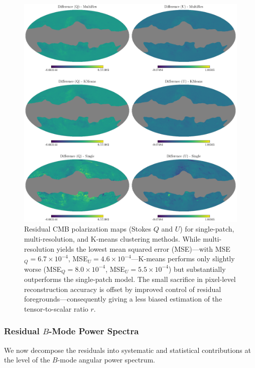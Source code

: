 \documentclass[%
 reprint,
bibnotes,
 amsmath,amssymb,
 aps,
floatfix, 
]{revtex4-2}
\begin{document}
\begin{figure}[ht]
    \centering
    \includegraphics[width=\linewidth]{figures/cmb_recon.pdf}
    \caption{
    Residual CMB polarization maps (Stokes \( Q \) and \( U \)) for single-patch, multi-resolution, and K-means clustering methods.  
    While multi-resolution yields the lowest mean squared error (MSE)—with MSE\(_Q = 6.7 \times 10^{-4}\), MSE\(_U = 4.6 \times 10^{-4}\)—K-means performs only slightly worse (MSE\(_Q = 8.0 \times 10^{-4}\), MSE\(_U = 5.5 \times 10^{-4}\)) but substantially outperforms the single-patch model. 
    The small sacrifice in pixel-level reconstruction accuracy is offset by improved control of residual foregrounds—consequently giving a less biased estimation of the tensor-to-scalar ratio \( r \).
    }
    \label{fig:cmb_qu_comparison}
\end{figure}

\subsubsection*{Residual \( B \)-Mode Power Spectra}
\label{subsec:residual_bb_spectra}

We now decompose the residuals into systematic and statistical contributions at the level of the \( B \)-mode angular power spectrum.
\end{document}
